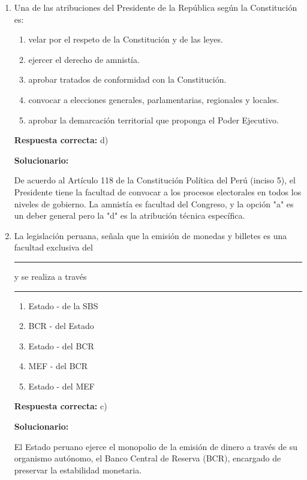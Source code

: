 \begin{enumerate}[resume]
	\item Una de las atribuciones del Presidente de la República según la Constitución es:
	\begin{enumerate}[label=\alph*)]
		\item velar por el respeto de la Constitución y de las leyes.
		\item ejercer el derecho de amnistía.
		\item aprobar tratados de conformidad con la Constitución.
		\item convocar a elecciones generales, parlamentarias, regionales y locales.
		\item aprobar la demarcación territorial que proponga el Poder Ejecutivo.
	\end{enumerate}
	\textbf{Respuesta correcta:} d)

	\vspace{2mm}
	\textbf{Solucionario:}

	De acuerdo al Artículo 118 de la Constitución Política del Perú (inciso 5), el Presidente tiene la facultad de convocar a los procesos electorales en todos los niveles de gobierno. La amnistía es facultad del Congreso, y la opción "a" es un deber general pero la "d" es la atribución técnica específica.

	\vspace{6mm}

	\item La legislación peruana, señala que la emisión de monedas y billetes es una facultad exclusiva del \rule{1.5cm}{0.4pt} y se realiza a través \rule{1.5cm}{0.4pt}
	\begin{enumerate}[label=\alph*)]
		\item Estado - de la SBS
		\item BCR - del Estado
		\item Estado - del BCR
		\item MEF - del BCR
		\item Estado - del MEF
	\end{enumerate}
	\textbf{Respuesta correcta:} c)

	\vspace{2mm}
	\textbf{Solucionario:}

	El Estado peruano ejerce el monopolio de la emisión de dinero a través de su organismo autónomo, el Banco Central de Reserva (BCR), encargado de preservar la estabilidad monetaria.

	\vspace{6mm}
\end{enumerate}

